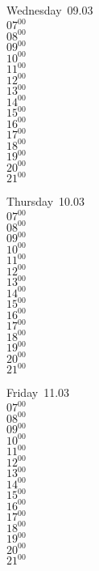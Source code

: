 \documentclass[11pt,a4paper]{book}\usepackage[]{graphicx}\usepackage[]{color}
\begin{document}
\begin{weekdaybox}
  Wednesday~09.03\\
  { 
  \vfill
  $07^{00}$\\
$08^{00}$\\
$09^{00}$\\
$10^{00}$\\
$11^{00}$\\
$12^{00}$\\
$13^{00}$\\
$14^{00}$\\
$15^{00}$\\
$16^{00}$\\
$17^{00}$\\
$18^{00}$\\
$19^{00}$\\
$20^{00}$\\
$21^{00}$\\
  }
\end{weekdaybox}
\clearpage
\begin{headerbox}
\end{headerbox}
\begin{weekdaybox}
  Thursday~10.03\\
  { 
  \vfill
  $07^{00}$\\
$08^{00}$\\
$09^{00}$\\
$10^{00}$\\
$11^{00}$\\
$12^{00}$\\
$13^{00}$\\
$14^{00}$\\
$15^{00}$\\
$16^{00}$\\
$17^{00}$\\
$18^{00}$\\
$19^{00}$\\
$20^{00}$\\
$21^{00}$\\
  }
\end{weekdaybox} 
\begin{weekdaybox}
  Friday~11.03\\
  { 
  \vfill
  $07^{00}$\\
$08^{00}$\\
$09^{00}$\\
$10^{00}$\\
$11^{00}$\\
$12^{00}$\\
$13^{00}$\\
$14^{00}$\\
$15^{00}$\\
$16^{00}$\\
$17^{00}$\\
$18^{00}$\\
$19^{00}$\\
$20^{00}$\\
$21^{00}$\\
  }
\end{weekdaybox}
\end{document}
